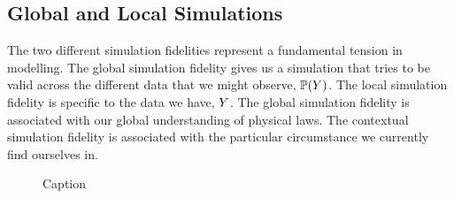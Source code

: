 \documentclass[]{article}
\begin{document}
\subsection{Global and Local Simulations}

The two different simulation fidelities represent a fundamental tension in modelling. The global simulation fidelity gives us a simulation that tries to be valid across the different data that we might observe, $\mathbb{P}(Y)$. The local simulation fidelity is specific to the data we have, $Y$. The global simulation fidelity is associated with our global understanding of physical laws. The contextual simulation fidelity is associated with the particular circumstance we currently find ourselves in.

\begin{figure}
    \centering
    \def\svgwidth{\textwidth}
   
    \caption{Caption}
    \label{fig:my_label}
\end{figure}
\end{document}
